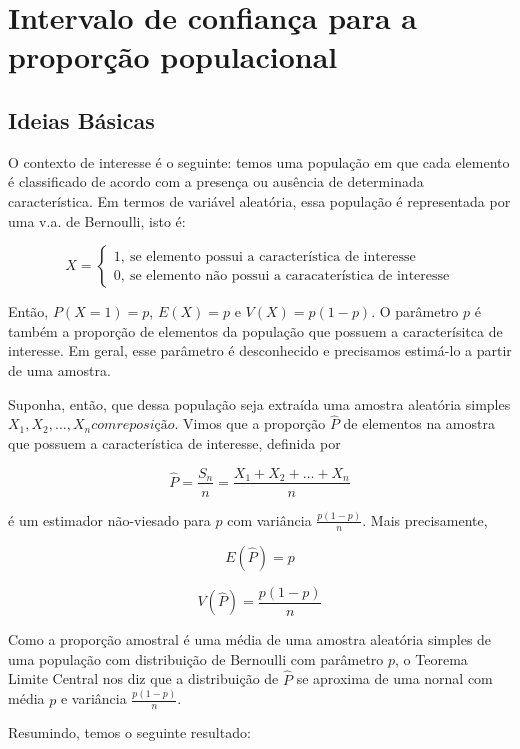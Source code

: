 \documentclass[
]{book}
\begin{document}
\hypertarget{intervalo-de-confianuxe7a-para-a-proporuxe7uxe3o-populacional}{%
\section{Intervalo de confiança para a proporção populacional}\label{intervalo-de-confianuxe7a-para-a-proporuxe7uxe3o-populacional}}

\hypertarget{ideias-buxe1sicas-2}{%
\subsection{Ideias Básicas}\label{ideias-buxe1sicas-2}}

O contexto de interesse é o seguinte: temos uma população em que cada elemento é classificado de acordo com a presença ou ausência de determinada característica. Em termos de variável aleatória, essa população é representada por uma v.a. de Bernoulli, isto é:

\[
X=\begin{cases}
1,~\text{se elemento possui a característica de interesse}\\
0,~\text{se elemento não possui a caracaterística de interesse}
\end{cases}
\]

Então, \(P(X = 1) = p\), \(E(X) = p\) e \(V(X) = p(1 - p)\). O parâmetro \(p\) é também a proporção de elementos da população que possuem a caracterísitca de interesse. Em geral, esse parâmetro é desconhecido e precisamos estimá-lo a partir de uma amostra.

Suponha, então, que dessa população seja extraída uma amostra aleatória simples \(X_1, X_2, \ldots, X_n com reposição\). Vimos que a proporção \(\hat P\) de elementos na amostra que possuem a característica de interesse, definida por

\[\hat P = \frac{S_n}{n}=\frac{X_1+X_2+\ldots+X_n}{n}\]

é um estimador não-viesado para \(p\) com variância \(\frac{p(1-p)}{n}\). Mais precisamente,

\[E(\hat P)=p\]

\[V(\hat P)=\frac{p(1-p)}{n}\]

Como a proporção amostral é uma média de uma amostra aleatória simples de uma população com distribuição de Bernoulli com parâmetro \(p\), o Teorema Limite Central nos diz que a distribuição de \(\hat P\) se aproxima de uma nornal com média \(p\) e variância \(\frac{p(1-p)}{n}\).

Resumindo, temos o seguinte resultado:
\end{document}
